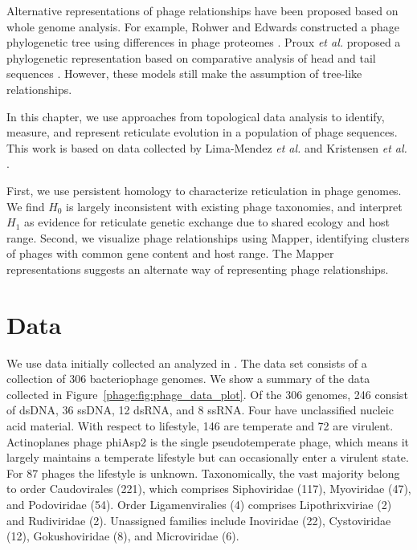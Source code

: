 Alternative representations of phage relationships have been proposed based on whole genome analysis.
For example, Rohwer and Edwards constructed a phage phylogenetic tree using differences in phage proteomes \cite{Rohwer:2002uo}.
Proux \emph{et al.} proposed a phylogenetic representation based on comparative analysis of head and tail sequences \cite{Proux:2002gj}.
However, these models still make the assumption of tree-like relationships.

In this chapter, we use approaches from topological data analysis to identify, measure, and represent reticulate evolution in a population of phage sequences.
This work is based on data collected by Lima-Mendez \emph{et al.} \cite{LimaMendez:2008ki} and Kristensen \emph{et al.} \cite{Kristensen:2013tt}.

First, we use persistent homology to characterize reticulation in phage genomes.
We find $H_0$ is largely inconsistent with existing phage taxonomies, and interpret $H_1$ as evidence for reticulate genetic exchange due to shared ecology and host range.
Second, we visualize phage relationships using Mapper, identifying clusters of phages with common gene content and host range.
The Mapper representations suggests an alternate way of representing phage relationships.

\section{Data}

We use data initially collected an analyzed in \cite{LimaMendez:2008ki}.
The data set consists of a collection of 306 bacteriophage genomes.
We show a summary of the data collected in Figure~\ref{phage:fig:phage_data_plot}.
Of the 306 genomes, 246 consist of dsDNA, 36 ssDNA, 12 dsRNA, and 8 ssRNA.
Four have unclassified nucleic acid material.
With respect to lifestyle, 146 are temperate and 72 are virulent.
Actinoplanes phage phiAsp2 is the single pseudotemperate phage, which means it largely maintains a temperate lifestyle but can occasionally enter a virulent state.
For 87 phages the lifestyle is unknown.
Taxonomically, the vast majority belong to order Caudovirales (221), which comprises Siphoviridae (117), Myoviridae (47), and Podoviridae (54). 
Order Ligamenviralies (4) comprises Lipothrixviriae (2) and Rudiviridae (2).
Unassigned families include Inoviridae (22), Cystoviridae (12), Gokushoviridae (8), and Microviridae (6).

